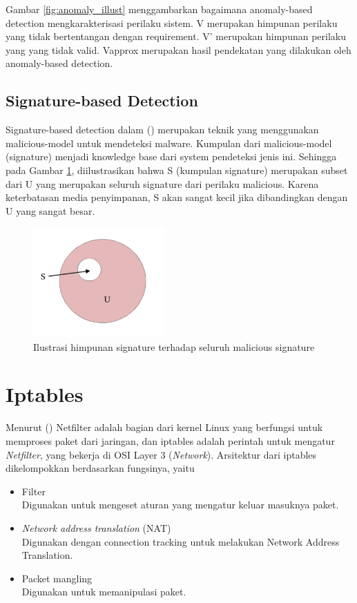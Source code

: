 Gambar \ref{fig:anomaly_illust} menggambarkan bagaimana anomaly-based detection mengkarakterisasi perilaku sistem. V merupakan himpunan perilaku yang tidak bertentangan dengan requirement. V’ merupakan himpunan perilaku yang yang tidak valid. Vapprox merupakan hasil pendekatan yang dilakukan oleh anomaly-based detection.

\subsection{Signature-based Detection}
Signature-based detection dalam (\cite{idika2007survey}) merupakan teknik yang menggunakan malicious-model untuk mendeteksi malware. Kumpulan dari malicious-model (signature) menjadi knowledge base dari system pendeteksi jenis ini. Sehingga pada Gambar \ref{fig:signature_illust}, diilustrasikan bahwa S (kumpulan signature) merupakan subset dari U yang merupakan seluruh signature dari perilaku malicious. Karena keterbatasan media penyimpanan, S akan sangat kecil jika dibandingkan dengan U yang sangat besar.

\begin{figure}[H]
	\centering
	\includegraphics[width=190px]{resources/signature_illustration.png}
	\caption{Ilustrasi himpunan signature terhadap seluruh malicious signature}
	\label{fig:signature_illust}
\end{figure}


\section{Iptables}

Menurut (\cite{purdy2004linux}) Netfilter adalah bagian dari kernel Linux yang berfungsi untuk memproses paket dari jaringan, dan iptables adalah perintah untuk mengatur \textit{Netfilter}, yang bekerja di OSI Layer 3 (\textit{Network}). Arsitektur dari iptables dikelompokkan berdasarkan fungsinya, yaitu
\begin{itemize}
	\item Filter\\
	Digunakan untuk mengeset aturan yang mengatur keluar masuknya paket.
	\item \textit{Network address translation} (NAT)\\
	Digunakan dengan connection tracking untuk melakukan Network Address Translation.
	\item Packet mangling\\
	Digunakan untuk memanipulasi paket.	
\end{itemize} 

